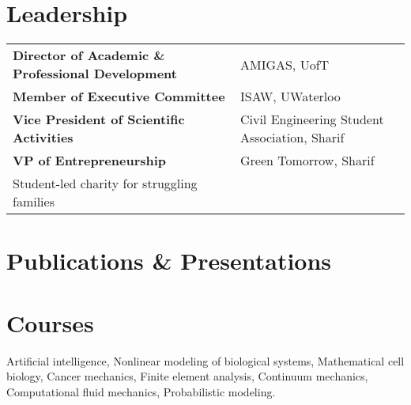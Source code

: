 \documentclass[a4paper,11pt]{article}
\begin{document}
\section{Leadership}

\begin{tabularx}{\linewidth}{@{}l X@{}}	
\textbf{Director of Academic \& Professional Development} & \hfill AMIGAS, UofT  \\
\textbf{Member of Executive Committee} & \hfill ISAW, UWaterloo \\ 
\textbf{Vice President of Scientific Activities} & \hfill Civil Engineering Student Association, Sharif\\
\textbf{VP of Entrepreneurship} & \hfill Green Tomorrow, Sharif\\
\quad Student-led charity for struggling families
\end{tabularx}

\section{Publications \& Presentations}
\begin{refsection}
\nocite{*}
\printbibliography[heading=none]
\end{refsection}




\section{Courses}
Artificial intelligence, Nonlinear modeling of biological systems, Mathematical cell biology, Cancer mechanics, Finite element analysis, Continuum mechanics, Computational fluid mechanics, Probabilistic modeling. %

\end{document}
